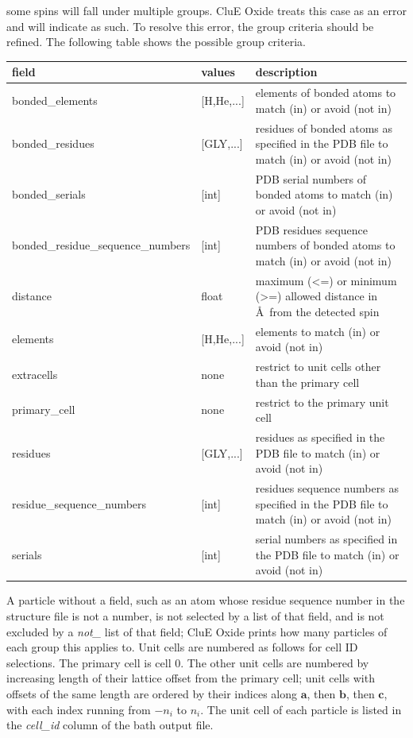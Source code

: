 \documentclass{book}
\begin{document}
some spins will fall under multiple groups. 
CluE Oxide treats this case as an error and will indicate as such. 
To resolve this error, the group criteria should be refined.
The following table shows the possible group criteria.
\begin{center}
\begin{tabular}{| m{20em} | m{1.5cm}| m{7cm} |}
 \hline 
 \textbf{field} & \textbf{values} & \textbf{description} \\ 
 \hline 
 bonded\_elements & [H,He,...] & elements of bonded atoms 
 to match (in) or avoid (not in)\\
 \hline 
 bonded\_residues & [GLY,...] & residues of bonded atoms 
 as specified in the PDB file to match (in) or avoid (not in)\\
 \hline 
 bonded\_serials & [int] & PDB serial numbers of bonded atoms 
 to match (in) or avoid (not in)\\
 \hline 
 bonded\_residue\_sequence\_numbers & [int] & PDB residues sequence numbers 
 of bonded atoms to match (in) or avoid (not in)\\
 \hline 
 distance & float & maximum (<=) or minimum (>=) allowed distance in 
 \AA~from the detected spin
 \\
 \hline 
 elements & [H,He,...] & elements to match (in) or avoid (not in)\\
 \hline 
 extracells & none & restrict to unit cells other than the primary cell\\
 \hline 
 primary\_cell & none & restrict to the primary unit cell\\
 \hline 
 residues & [GLY,...] & residues as specified in the PDB file
 to match (in) or avoid (not in)\\
 \hline 
 residue\_sequence\_numbers & [int] & residues sequence numbers 
 as specified in the PDB file to match (in) or avoid (not in)\\
 \hline 
 serials & [int] & serial numbers as specified in the PDB file
 to match (in) or avoid (not in)\\
 \hline 
\end{tabular}
\end{center}  
A particle without a field, such as an atom whose residue sequence number 
in the structure file is not a number, is not selected by a list of 
that field, and is not excluded by a \textit{not\_} list of that field;
CluE Oxide prints how many particles of each group this applies to.
Unit cells are numbered as follows for cell ID selections.
The primary cell is cell 0.
The other unit cells are numbered by increasing length of their 
lattice offset from the primary cell;
unit cells with offsets of the same length are ordered by their indices
along $\mathbf{a}$, then $\mathbf{b}$, then $\mathbf{c}$, 
with each index running from $-n_i$ to $n_i$.
The unit cell of each particle is listed in the \textit{cell\_id} column of 
the bath output file.
\end{document}
